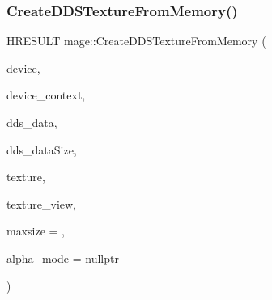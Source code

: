 \subsubsection{\texorpdfstring{Create\+D\+D\+S\+Texture\+From\+Memory()}{CreateDDSTextureFromMemory()}\hspace{0.1cm}{\footnotesize\ttfamily [2/4]}}
{\footnotesize\ttfamily H\+R\+E\+S\+U\+LT mage\+::\+Create\+D\+D\+S\+Texture\+From\+Memory (\begin{DoxyParamCaption}\item[{\+\_\+\+In\+\_\+ I\+D3\+D11\+Device2 $\ast$}]{device,  }\item[{\+\_\+\+In\+\_\+opt\+\_\+ I\+D3\+D11\+Device\+Context $\ast$}]{device\+\_\+context,  }\item[{\+\_\+\+In\+\_\+reads\+\_\+bytes\+\_\+(dds\+\_\+data\+Size) const uint8\+\_\+t $\ast$}]{dds\+\_\+data,  }\item[{\+\_\+\+In\+\_\+ size\+\_\+t}]{dds\+\_\+data\+Size,  }\item[{\+\_\+\+Outptr\+\_\+opt\+\_\+ I\+D3\+D11\+Resource $\ast$$\ast$}]{texture,  }\item[{\+\_\+\+Outptr\+\_\+opt\+\_\+ I\+D3\+D11\+Shader\+Resource\+View $\ast$$\ast$}]{texture\+\_\+view,  }\item[{\+\_\+\+In\+\_\+ size\+\_\+t}]{maxsize = {},  }\item[{\+\_\+\+Out\+\_\+opt\+\_\+ \hyperlink{namespacemage_a0c586a2bad862f4858900ca121ca80c2}{D\+D\+S\+\_\+\+A\+L\+P\+H\+A\+\_\+\+M\+O\+DE} $\ast$}]{alpha\+\_\+mode = {\ttfamily nullptr} }\end{DoxyParamCaption})}

\hypertarget{namespacemage_a1570abdb85a5a68b2d78944b2446f98d}{}\label{namespacemage_a1570abdb85a5a68b2d78944b2446f98d} 
